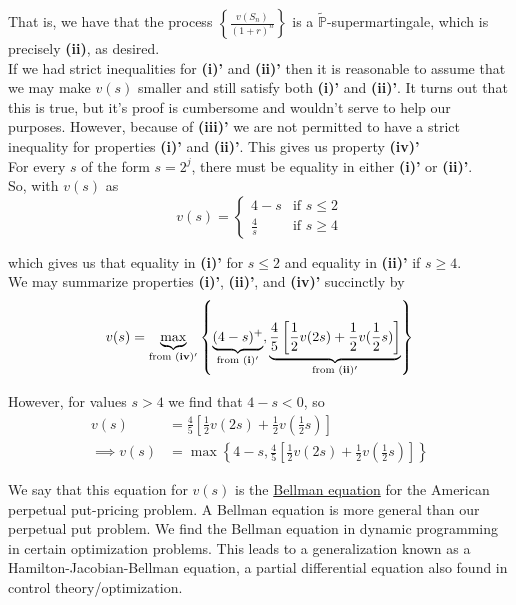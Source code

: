 \documentclass[12pt]{article}
\newlength\tindent
\renewcommand{\indent}{\hspace*{\tindent}}
\renewcommand{\P}{\mathbb P}
\begin{document}
\indent That is, we have that the process $\left\{ \frac{v(S_n)}{(1 + r)^n} \right\} $ is a $\tilde{\P}$-supermartingale, which is precisely {\bf (ii)}, as desired. \\

\indent If we had strict inequalities for {\bf (i)'} and {\bf (ii)'} then it is reasonable to assume that we may make $v(s)$ smaller and still satisfy both {\bf (i)'} and {\bf (ii)'}. It turns out that this is true, but it's proof is cumbersome and wouldn't serve to help our purposes. However, because of {\bf (iii)'} we are not permitted to have a strict inequality for properties {\bf (i)'} and {\bf (ii)'}. This gives us property {\bf (iv)'} \\

\indent {\bf (iv)'} For every $s$ of the form $s = 2^j$, there must be equality in either {\bf (i)'} or {\bf (ii)'}. \\

So, with $v(s)$ as 
\begin{equation*}
	v(s) = 
	\begin{cases}
		4 - s & \text{if } s \leq 2 \\
		\frac{4}{s} & \text{if } s \geq 4
	\end{cases}
\end{equation*}

which gives us that equality in {\bf (i)'} for $s \leq 2$ and equality in {\bf (ii)'} if $s \geq 4$. \\

We may summarize properties {\bf (i)'}, {\bf (ii)'}, and {\bf (iv)'} succinctly by
\begin{equation*}
	v(s) = \underbrace{\max}_{\text{from } {\bf (iv)'}} \left\{ \underbrace{(4 - s)^+}_{\text{from } {\bf (i)'}}, \underbrace{\frac{4}{5}\left[\frac{1}{2} v(2s) + \frac{1}{2}v(\frac{1}{2} s) \right]}_{\text{from } {\bf (ii)'}} \right\}
\end{equation*}

However, for values $s > 4$ we find that $4 - s < 0$, so
\begin{align*}
	v(s) &= \frac{4}{5}\left[\frac{1}{2} v(2s) + \frac{1}{2}v(\frac{1}{2} s)\right] \\
	\implies v(s) &= \max \left\{ 4 - s, \frac{4}{5}\left[\frac{1}{2} v(2s) + \frac{1}{2}v(\frac{1}{2} s) \right] \right\}
\end{align*}

\indent We say that this equation for $v(s)$ is the \underline{Bellman equation} for the American perpetual put-pricing problem. A Bellman equation is more general  than our perpetual put problem. We find the Bellman equation in dynamic programming in certain optimization problems. This leads to a generalization known as a Hamilton-Jacobian-Bellman equation, a partial differential equation also found in control theory/optimization. \\
\end{document}
